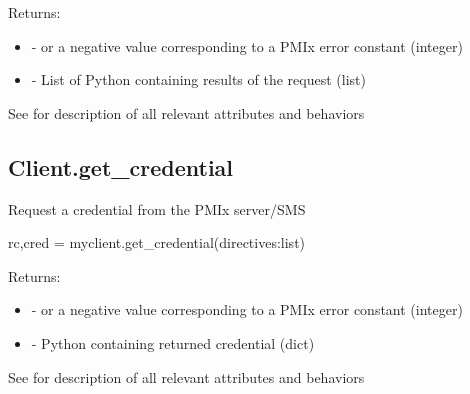 \begin{arglist}
\end{arglist}

Returns:

\begin{itemize}
    \item {} -  or a negative value corresponding to a PMIx error constant (integer)
    \item {} - List of Python  containing results of the request (list)
\end{itemize}


See  for description of all relevant attributes and behaviors


\subsection{Client.get_credential}

\summary

Request a credential from the PMIx server/SMS

\format

\pyspecificstart
\begin{codepar}
rc,cred = myclient.get_credential(directives:list)
\end{codepar}
\pyspecificend

\begin{arglist}
\end{arglist}

Returns:

\begin{itemize}
    \item {} -  or a negative value corresponding to a PMIx error constant (integer)
    \item {} - Python  containing returned credential (dict)
\end{itemize}


See  for description of all relevant attributes and behaviors


